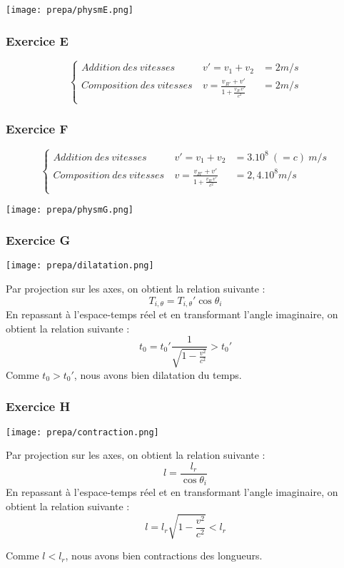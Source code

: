 \documentclass[british,french,11pt, a4paper, openany]{book}
\begin{document}
		
		
		
		\begin{center}
			\texttt{[image: prepa/physmE.png]}\\
		\end{center}
		\subsubsection*{Exercice E}
		
		$$\left\{\begin{array}{lll}
		Addition\ des\ vitesses\ & v' = v_1 + v_2 & = 2m/s \\
		Composition\ des\ vitesses\ & v = \frac{v_{R'} + v'}{1 + \frac{v_{R'}v'}{c^2}} & = 2m/s\\
		\end{array}\right.$$
		
		\subsubsection*{Exercice F}
		$$\left\{\begin{array}{lll}
		Addition\ des\ vitesses\ & v' = v_1 + v_2 & = 3.10^8\ (=c)\ m/s \\
		Composition\ des\ vitesses\ & v = \frac{v_{R'} + v'}{1 + \frac{v_{R'}v'}{c^2}} & = 2,4.10^8m/s\\
		\end{array}\right.$$
		
		\begin{center}
			\texttt{[image: prepa/physmG.png]}\\
		\end{center}
		
		\subsubsection*{Exercice G}
		\begin{center}
			\texttt{[image: prepa/dilatation.png]}
		\end{center}
		Par projection sur les axes, on obtient la relation suivante : 
		$$T_{i, \theta} = T_{i, \theta}'\cos \theta_i$$
		En repassant à l'espace-temps réel et en transformant l'angle imaginaire, on obtient la relation suivante :
		$$t_0 = t_0'\frac{1}{\sqrt{1 - \frac{v^2}{c^2}}} > t_0'$$
		Comme $t_0 > t_0'$, nous avons bien dilatation du temps.
		
		\newpage
		\subsubsection*{Exercice H}
		\begin{center}
			\texttt{[image: prepa/contraction.png]}
		\end{center}
		Par projection sur les axes, on obtient la relation suivante : 
		$$l = \frac{l_r}{\cos \theta_i}$$
		En repassant à l'espace-temps réel et en transformant l'angle imaginaire, on obtient la relation suivante :
		$$l = l_r \sqrt{1 - \frac{v^2}{c^2}} < l_r$$
		
		Comme $l < l_r$, nous avons bien contractions des longueurs.
		
		
		
\end{document}
